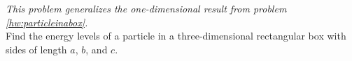 \emph{This problem generalizes the one-dimensional result from problem \ref{hw:particleinabox}.}\\
Find the energy levels of a particle in a three-dimensional rectangular box with sides
of length $a$, $b$, and $c$.\answercheck
